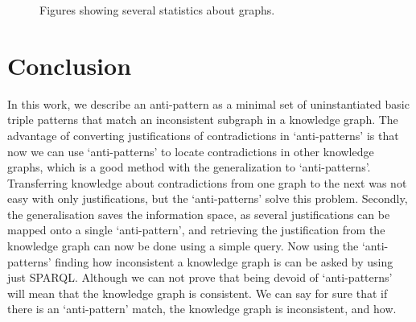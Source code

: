 \documentclass[11pt,letterpaper ,oneside ]{book}
\begin{document}
	
	
	
	\begin{figure}[!t]
		\caption{Figures showing several statistics about graphs.}
		\label{fig:GraphStats}
	\end{figure}
	
	
	\newpage
	
	
	\chapter{Conclusion}\label{Conclusion}
	In this work, we describe an anti-pattern as a minimal set of uninstantiated basic triple patterns that match an inconsistent subgraph in a knowledge graph. The advantage of converting justifications of contradictions in `anti-patterns' is that now we can use `anti-patterns' to locate contradictions in other knowledge graphs, which is a good method with the generalization to `anti-patterns'. Transferring knowledge about contradictions from one graph to the next was not easy with only justifications, but the `anti-patterns' solve this problem. 
	Secondly, the generalisation saves the information space, as several justifications can be mapped onto a single `anti-pattern', and retrieving the justification from the knowledge graph can now be done using a simple query. Now using the `anti-patterns' finding how inconsistent a knowledge graph is can be asked by using just SPARQL. Although we can not prove that being devoid of `anti-patterns' will mean that the knowledge graph is consistent. We can say for sure that if there is an `anti-pattern' match, the knowledge graph is inconsistent, and how.  \\
	
\end{document}

